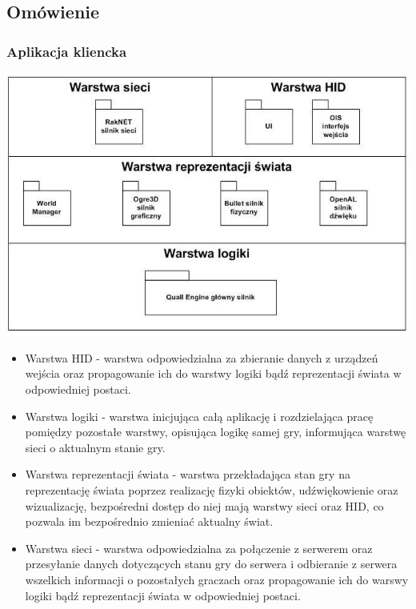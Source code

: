 \documentclass[12pt,a4paper,twoside]{article}
\begin{document}
\subsection{Omówienie}


\subsubsection{Aplikacja kliencka}
\includegraphics{pics/LogicalViewClient.jpg}
\begin{itemize}
\item Warstwa HID - warstwa odpowiedzialna za zbieranie danych z urządzeń wejścia oraz propagowanie ich do warstwy logiki bądź reprezentacji świata w odpowiedniej postaci.
\item Warstwa logiki - warstwa inicjująca całą aplikację i rozdzielająca pracę pomiędzy pozostałe warstwy, opisująca logikę samej gry, informująca warstwę sieci o aktualnym stanie gry.
\item Warstwa reprezentacji świata - warstwa przekładająca stan gry na reprezentację świata poprzez realizację fizyki obiektów, udźwiękowienie oraz wizualizację, bezpośredni dostęp do niej mają warstwy sieci oraz HID, co pozwala im bezpośrednio zmieniać aktualny świat.
\item Warstwa sieci - warstwa odpowiedzialna za połączenie z serwerem oraz przesyłanie danych dotyczących stanu gry do serwera i odbieranie z serwera wszelkich informacji o pozostałych graczach oraz propagowanie ich do warswy logiki bądź reprezentacji świata w odpowiedniej postaci.
\end{itemize}
\end{document}
